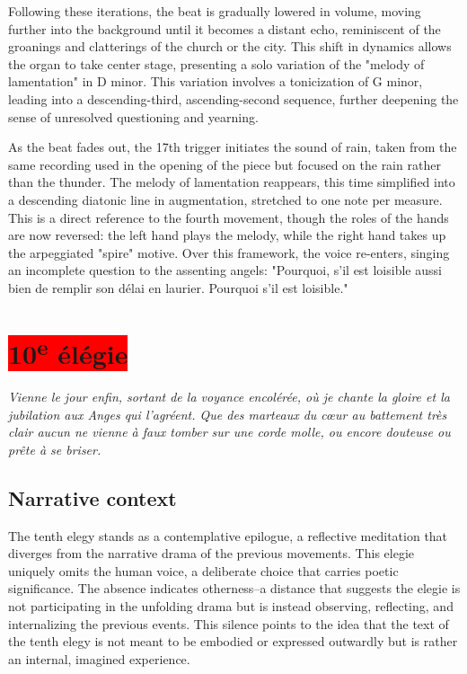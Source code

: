 \documentclass[12pt,twoside,maitrise]{dms_ks}
\theoremstyle{definition}
\begin{document}
{Following these iterations, the beat is gradually lowered in volume, moving further into the background until it becomes a distant echo, reminiscent of the groanings and clatterings of the church or the city. 
This shift in dynamics allows the organ to take center stage, presenting a solo variation of the "melody of lamentation" in D minor. 
This variation involves a tonicization of G minor, leading into a descending-third, ascending-second sequence, further deepening the sense of unresolved questioning and yearning.


As the beat fades out, the 17th trigger initiates the sound of rain, taken from the same recording used in the opening of the piece but focused on the rain rather than the thunder. 
The melody of lamentation reappears, this time simplified into a descending diatonic line in augmentation, stretched to one note per measure. 
This is a direct reference to the fourth movement, though the roles of the hands are now reversed: the left hand plays the melody, while the right hand takes up the arpeggiated "spire" motive. 
Over this framework, the voice re-enters, singing an incomplete question to the assenting angels: "Pourquoi, s'il est loisible aussi bien de remplir son délai en laurier. 
Pourquoi s'il est loisible."


\section{\colorbox{red}{10\textsuperscript{e} élégie}}

\epigraph{\textit{Vienne le jour enfin, sortant de la voyance encolérée, où je chante la gloire et la jubilation aux Anges qui l’agréent. Que des marteaux du cœur au battement très clair aucun ne vienne à faux tomber sur une corde molle, ou encore douteuse ou prête à se briser.}}{}

\subsection{Narrative context}

The tenth elegy stands as a contemplative epilogue, a reflective meditation that diverges from the narrative drama of the previous movements. 
This elegie uniquely omits the human voice, a deliberate choice that carries poetic significance. 
The absence indicates otherness--a distance that suggests the elegie is not participating in the unfolding drama but is instead observing, reflecting, and internalizing the previous events. 
This silence points to the idea that the text of the tenth elegy is not meant to be embodied or expressed outwardly but is rather an internal, imagined experience.

}
\end{document}
